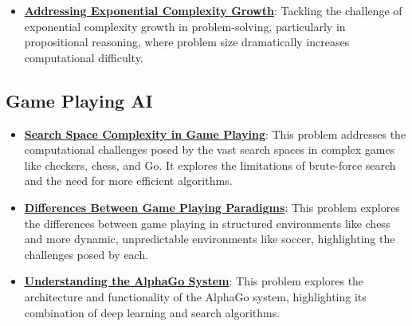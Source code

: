 \documentclass{article}%
\begin{document}
\begin{itemize}[leftmargin=*]
\item \href{https://purdue.brightspace.com/d2l/common/assets/pdfjs-d2l-dist/1.0.14-legacy/web/viewer.html?file=\%2Fcontent\%2Fenforced\%2F1095467-wl.202510.CS.24300.001\%2F15L2-SAT.pdf\%3Fou\%3D1095467\&lang=en-us\&container=d2l-fileviewer-rendered-pdf\&fullscreen=d2l-fileviewer-rendered-pdf-dialog\&height=667#page=4}{\textbf{Addressing Exponential Complexity Growth}}: Tackling the challenge of exponential complexity growth in problem-solving, particularly in propositional reasoning, where problem size dramatically increases computational difficulty.%
\end{itemize}

%
\subsection{Game Playing AI}%
\label{subsec:GamePlayingAI}%
\begin{itemize}[leftmargin=*]%
\item \href{https://purdue.brightspace.com/d2l/common/assets/pdfjs-d2l-dist/1.0.14-legacy/web/viewer.html?file=\%2Fcontent\%2Fenforced\%2F1095467-wl.202510.CS.24300.001\%2F02L2-Intro.pdf\%3Fou\%3D1095467\&lang=en-us\&container=d2l-fileviewer-rendered-pdf\&fullscreen=d2l-fileviewer-rendered-pdf-dialog\&height=667#page=11}{\textbf{Search Space Complexity in Game Playing}}: This problem addresses the computational challenges posed by the vast search spaces in complex games like checkers, chess, and Go. It explores the limitations of brute-force search and the need for more efficient algorithms.%
\item \href{https://purdue.brightspace.com/d2l/common/assets/pdfjs-d2l-dist/1.0.14-legacy/web/viewer.html?file=\%2Fcontent\%2Fenforced\%2F1095467-wl.202510.CS.24300.001\%2F02L2-Intro.pdf\%3Fou\%3D1095467\&lang=en-us\&container=d2l-fileviewer-rendered-pdf\&fullscreen=d2l-fileviewer-rendered-pdf-dialog\&height=667#page=27}{\textbf{Differences Between Game Playing Paradigms}}: This problem explores the differences between game playing in structured environments like chess and more dynamic, unpredictable environments like soccer, highlighting the challenges posed by each.%
\item \href{https://purdue.brightspace.com/d2l/common/assets/pdfjs-d2l-dist/1.0.14-legacy/web/viewer.html?file=\%2Fcontent\%2Fenforced\%2F1095467-wl.202510.CS.24300.001\%2F02L2-Intro.pdf\%3Fou\%3D1095467\&lang=en-us\&container=d2l-fileviewer-rendered-pdf\&fullscreen=d2l-fileviewer-rendered-pdf-dialog\&height=667#page=50}{\textbf{Understanding the AlphaGo System}}: This problem explores the architecture and functionality of the AlphaGo system, highlighting its combination of deep learning and search algorithms.%
\end{itemize}
\end{document}

